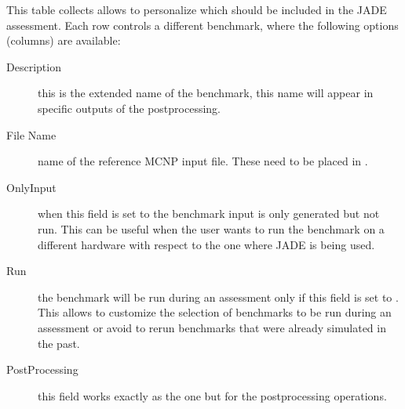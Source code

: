\documentclass[letterpaper,10pt,english]{sphinxmanual}
\begin{document}
This table collects allows to personalize which  should be included
in the JADE assessment. Each row controls a different benchmark, where the following options
(columns) are available:
\begin{description}
\item[{Description}] \leavevmode
this is the extended name of the benchmark, this name will appear in specific outputs of the
post\sphinxhyphen{}processing.

\item[{File Name}] \leavevmode
name of the reference MCNP input file. These need to be placed in .

\item[{OnlyInput}] \leavevmode
when this field is set to  the benchmark input is only generated but not run. This can be
useful when the user wants to run the benchmark on a different hardware with respect to the
one where JADE is being used.




{\hyperref[\detokenize{usage/tipstricks:externalrun}]{}}



\item[{Run}] \leavevmode
the benchmark will be run during an assessment only if this field is set to .
This allows to customize the selection of benchmarks to be run during an assessment or avoid
to re\sphinxhyphen{}run benchmarks that were already simulated in the past.

\item[{Post\sphinxhyphen{}Processing}] \leavevmode
this field works exactly as the  one but for the post\sphinxhyphen{}processing operations.

\end{description}
\end{document}
